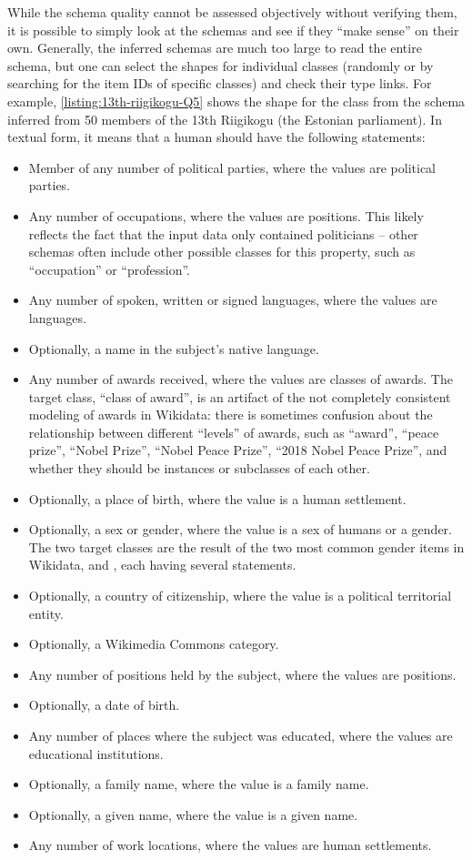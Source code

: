 While the \gls{schema} quality cannot be assessed objectively without verifying them,
it is possible to simply look at the \glspl{schema} and see if they “make sense” on their own.
Generally, the inferred \glspl{schema} are much too large to read the entire \gls{schema},
but one can select the \glspl{shape} for individual classes
(randomly or by searching for the \glspl{item ID} of specific classes)
and check their type links.
For example, \cref{listing:13th-riigikogu-Q5} shows the \gls{shape} for the class 
from the \gls{schema} inferred from 50 members of the 13th Riigikogu (the Estonian parliament).
In textual form, it means that a human should have the following \glspl{statement}:
\begin{itemize}
\item Member of any number of political parties, where the values are political parties.
\item Any number of occupations, where the values are positions.
  This likely reflects the fact that the input data only contained politicians –
  other \glspl{schema} often include other possible classes for this property,
  such as “occupation” or “profession”.
\item Any number of spoken, written or signed languages, where the values are languages.
\item Optionally, a name in the subject’s native language.
\item Any number of awards received, where the values are classes of awards.
  The target class, “class of award”, is an artifact of the not completely consistent modeling of awards in \gls{Wikidata}:
  there is sometimes confusion about the relationship between different “levels” of awards,
  such as “award”, “peace prize”, “Nobel Prize”, “Nobel Peace Prize”, “2018 Nobel Peace Prize”,
  and whether they should be instances or subclasses of each other.
\item Optionally, a place of birth, where the value is a human settlement.
\item Optionally, a sex or gender, where the value is a sex of humans or a gender.
  The two target classes are the result of the two most common gender \glspl{item} in \gls{Wikidata},
   and ,
  each having several  statements.
\item Optionally, a country of citizenship, where the value is a political territorial entity.
\item Optionally, a \gls{Wikimedia Commons} category.
\item Any number of positions held by the subject, where the values are positions.
\item Optionally, a date of birth.
\item Any number of places where the subject was educated, where the values are educational institutions.
\item Optionally, a family name, where the value is a family name.
\item Optionally, a given name, where the value is a given name.
\item Any number of work locations, where the values are human settlements.
\end{itemize}


